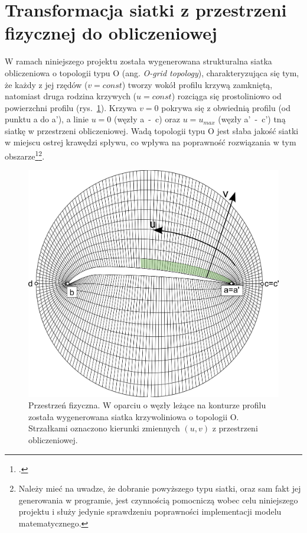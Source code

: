\section{Transformacja siatki z przestrzeni fizycznej do obliczeniowej}

\indent\indent W ramach niniejszego projektu została wygenerowana strukturalna siatka obliczeniowa o topologii typu O (ang. \textit{O-grid topology}), charakteryzująca się tym, że każdy z jej rzędów ($v=const$) tworzy wokół profilu krzywą zamkniętą, natomiast druga rodzina krzywych ($u=const$) rozciąga się prostoliniowo od powierzchni profilu (rys.~\ref{fig:siatka_krzywoliniowa}). Krzywa $v = 0$ pokrywa się z obwiednią profilu (od punktu \textsf{a} do \textsf{a'}), a linie $u=0$ (węzły \textsf{a}~-~\textsf{c}) oraz $u=u_{max}$ (węzły \textsf{a'}~-~\textsf{c'}) tną siatkę w przestrzeni obliczeniowej. Wadą topologii typu O jest słaba jakość siatki w miejscu ostrej krawędzi spływu, co wpływa na poprawność rozwiązania w tym obszarze\footcite{Blazek, s. 359}\footnote{Należy mieć na uwadze, że dobranie powyższego typu siatki, oraz sam fakt jej generowania w programie, jest czynnością pomocniczą wobec celu niniejszego projektu i służy jedynie sprawdzeniu poprawności implementacji modelu matematycznego.}.

\begin{figure}[H]
	\centering
	\includegraphics[width=0.8\linewidth]{Rysunki/siatka_krzywoliniowa.png}  
	\caption{Przestrzeń fizyczna. W oparciu o węzły leżące na konturze profilu została wygenerowana siatka krzywoliniowa o topologii O. Strzałkami oznaczono kierunki zmiennych $(u,v)$ z przestrzeni obliczeniowej. 
	\label{fig:siatka_krzywoliniowa}}
\end{figure} 

